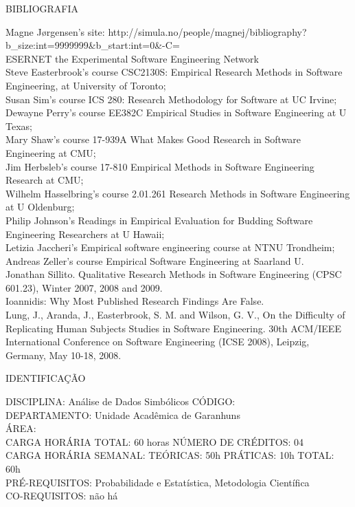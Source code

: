 \documentclass[
	12pt,				%
	openright,			%
  oneside,     %
	a4paper,			%
	chapter=TITLE,		%
	english,			%
	french,				%
	spanish,			%
	brazil				%
	]{abntex2}
\begin{document}
\begin{apendicesenv}
BIBLIOGRAFIA 

Magne Jørgensen's site:
http://simula.no/people/magnej/bibliography?b\_size:int=9999999\&b\_start:int=0\&-C=\\
ESERNET  the Experimental Software Engineering Network\\
Steve Easterbrook's course CSC2130S: Empirical Research
Methods in Software Engineering, at University of Toronto;\\
Susan Sim's course ICS 280: Research Methodology for
Software at UC Irvine;\\
Dewayne Perry's course EE382C Empirical Studies in
Software Engineering at U Texas;\\
Mary Shaw's course 17-939A What Makes Good Research in
Software Engineering at CMU;\\
Jim Herbsleb's course 17-810 Empirical Methods in
Software Engineering Research at CMU;\\
Wilhelm Hasselbring's course 2.01.261 Research Methods
in Software Engineering at U Oldenburg;\\
Philip Johnson's Readings in Empirical Evaluation for
Budding Software Engineering Researchers at U Hawaii;\\
Letizia Jaccheri's Empirical software engineering
course at NTNU Trondheim;\\
Andreas Zeller's course Empirical Software Engineering
at Saarland U.\\
Jonathan Sillito. Qualitative Research Methods in Software Engineering
(CPSC 601.23), Winter 2007, 2008 and 2009.\\
Ioannidis: Why Most Published Research Findings Are False.\\
Lung, J., Aranda, J., Easterbrook, S. M. and Wilson, G. V., On the
Difficulty of Replicating Human Subjects Studies in Software
Engineering. 30th ACM/IEEE International Conference on Software
Engineering (ICSE 2008), Leipzig, Germany, May 10-18,
2008.

\newpage IDENTIFICAÇÃO

DISCIPLINA: Análise de Dados Simbólicos CÓDIGO: \\
DEPARTAMENTO: Unidade Acadêmica de Garanhuns \\
ÁREA: \\
CARGA HORÁRIA TOTAL: 60 horas NÚMERO DE CRÉDITOS: 04\\
CARGA HORÁRIA SEMANAL: TEÓRICAS: 50h PRÁTICAS: 10h TOTAL: 60h\\
PRÉ-REQUISITOS: Probabilidade e Estatística, Metodologia Científica\\
CO-REQUISITOS: não há


\end{apendicesenv}
\end{document}
